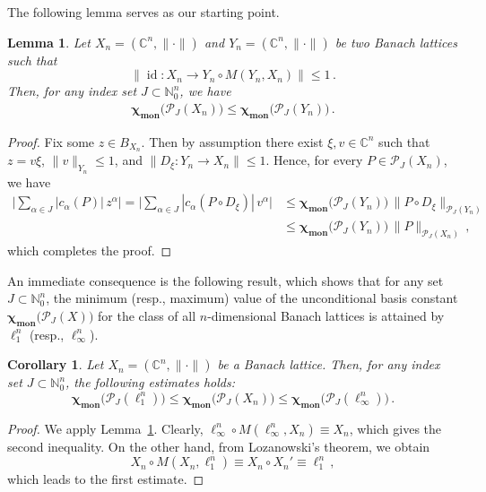 \documentclass[12pt]{amsart}
\numberwithin{subsection}{section}
\newtheorem{corollary}[theorem]{Corollary}
\newtheorem{lemma}[theorem]{Lemma}
\theoremstyle{definition}
\theoremstyle{remark}
\DeclareMathOperator{\mon}{mon}
\DeclareMathOperator{\id}{\mathrm{id}}
\newcommand{\chimon}{\chi_{\mon}}
\begin{document}
The following lemma serves as our starting point.

\begin{lemma} \label{YM(Y,X)}
Let $X_n = (\mathbb{C}^n, \|\cdot\|)$ and $Y_n = (\mathbb{C}^n, \|\cdot\|)$ be two Banach lattices such that
\[
\|\id \colon X_n \to Y_n\circ M(Y_n, X_n)\| \leq 1\,.
\]
Then, for any index set $J \subset \mathbb{N}_{0}^n$, we have
\begin{align*}
\boldsymbol{\chimon}\big(\mathcal{P}_{J}(X_n)\big) \leq \boldsymbol{\chimon}\big(\mathcal{P}_{J}(Y_n)\big)\,.
\end{align*}
\end{lemma}


\begin{proof}
Fix some $z\in B_{X_n}$. Then by assumption there exist $\xi, v\in \mathbb{C}^n$ such that  $z= v \xi$, $\|v\|_{Y_n} \leq 1$,
and $\|D_\xi \colon Y_n \to X_n\|\leq 1$. Hence, for every $P\in \mathcal{P}_J(X_n)$, we have
\begin{align*}
\Big| \sum_{\alpha \in J} |c_\alpha(P)|\,z^\alpha\Big| = \Big|\sum_{\alpha \in J} |c_\alpha(P\circ D_\xi)|\,v^\alpha\Big|
& \leq \boldsymbol{\chimon}\big(\mathcal{P}_J(Y_n)\big)\,\|P\circ D_\xi\|_{\mathcal{P}_J(Y_n)} \\
& \leq \boldsymbol{\chimon}\big(\mathcal{P}_J(Y_n)\big)\,\|P\|_{\mathcal{P}_J(X_n)}\,,
\end{align*}
which completes the proof.
\end{proof}


An immediate consequence is the following result, which shows that for any set $J\subset \mathbb{N}_{0}^n$, the minimum
(resp., maximum) value of the unconditional basis constant $\boldsymbol{\chimon}\big(\mathcal{P}_{J}(X)\big)$ for the
class of all $n$-dimensional Banach lattices is attained by $\ell_{1}^n$ (resp., $\ell_{\infty}^n$).


\begin{corollary} \label{C1C2}
Let $X_n = (\mathbb{C}^n, \|\cdot\|)$  be a Banach lattice. Then, for any index set $J\subset \mathbb{N}_{0}^n$, the following
estimates holds{\rm:}
\[
\boldsymbol{\chimon}\big(\mathcal{P}_{J}(\ell^n_1)\big) \le
\boldsymbol{\chimon}\big(\mathcal{P}_{J}(X_n)\big) \le \boldsymbol{\chimon}\big(\mathcal{P}_{J}(\ell^n_\infty)\big)\,.
\]
\end{corollary}

\begin{proof}
We apply Lemma~\ref{YM(Y,X)}. Clearly, $\ell^n_\infty \circ M(\ell^n_\infty, X_n ) \equiv X_n$, which  gives the
second inequality. On the other hand, from Lozanowski's theorem, we obtain
\[
X_n  \circ M( X_n ,\ell^n_1 ) \equiv X_n  \circ  X_n'  \equiv\ell^n_1\,,
\]
which leads to the first estimate.
\end{proof}
\end{document}
